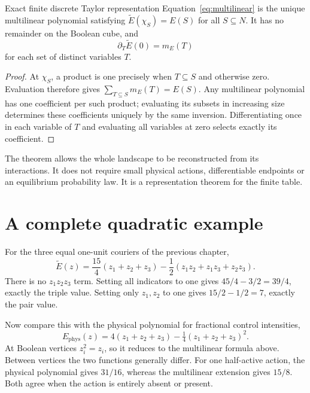 \begin{theorem}{Exact finite discrete Taylor representation}\label{thm:multilinear}
Equation~\ref{eq:multilinear} is the unique multilinear polynomial satisfying $\widetilde E(\chi_S)=E(S)$ for all $S\subseteq N$. It has no remainder on the Boolean cube, and
\begin{equation}
 \partial_T\widetilde E(0)=m_E(T)
\end{equation}
for each set of distinct variables $T$.
\end{theorem}
\begin{proof}
At $\chi_S$, a product is one precisely when $T\subseteq S$ and otherwise zero. Evaluation therefore gives $\sum_{T\subseteq S}m_E(T)=E(S)$. Any multilinear polynomial has one coefficient per such product; evaluating its subsets in increasing size determines these coefficients uniquely by the same inversion. Differentiating once in each variable of $T$ and evaluating all variables at zero selects exactly its coefficient.
\end{proof}

The theorem allows the whole landscape to be reconstructed from its interactions. It does not require small physical actions, differentiable endpoints or an equilibrium probability law. It is a representation theorem for the finite table.

\section{A complete quadratic example}
For the three equal one-unit couriers of the previous chapter,
\begin{equation}
 \widetilde E(z)=\frac{15}{4}(z_1+z_2+z_3)
             -\frac12(z_1z_2+z_1z_3+z_2z_3).
\end{equation}
There is no $z_1z_2z_3$ term. Setting all indicators to one gives $45/4-3/2=39/4$, exactly the triple value. Setting only $z_1,z_2$ to one gives $15/2-1/2=7$, exactly the pair value.

Now compare this with the physical polynomial for fractional control intensities,
\begin{equation}
 E_{\mathrm{phys}}(z)=4(z_1+z_2+z_3)-\tfrac14(z_1+z_2+z_3)^2.
\end{equation}
At Boolean vertices $z_i^2=z_i$, so it reduces to the multilinear formula above. Between vertices the two functions generally differ. For one half-active action, the physical polynomial gives $31/16$, whereas the multilinear extension gives $15/8$. Both agree when the action is entirely absent or present.

